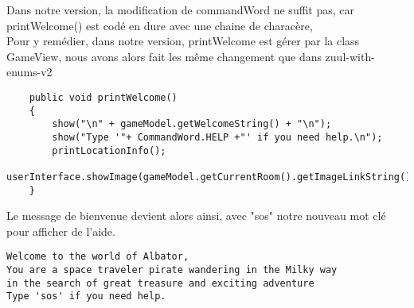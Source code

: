 \documentclass[a4paper , 10pt]{article}
\begin{document}
Dans notre version, la modification de commandWord ne suffit pas, car printWelcome() est codé en dure avec une chaine de characère,\\
Pour y remédier, dans notre version, printWelcome est gérer par la class GameView, nous avons alors fait les même changement que dans zuul-with-enums-v2\\
\begin{verbatim}
    public void printWelcome()
    {
        show("\n" + gameModel.getWelcomeString() + "\n");
        show("Type '"+ CommandWord.HELP +"' if you need help.\n");
        printLocationInfo();
        userInterface.showImage(gameModel.getCurrentRoom().getImageLinkString());
    }
\end{verbatim}
Le message de bienvenue devient alors ainsi, avec "sos" notre nouveau mot clé pour afficher de l'aide.
\begin{verbatim}
Welcome to the world of Albator,
You are a space traveler pirate wandering in the Milky way 
in the search of great treasure and exciting adventure  
Type 'sos' if you need help.
\end{verbatim}
\end{document}
